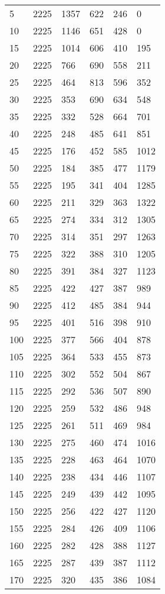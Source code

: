 \begin{longtable}{|l|l|l|l|l|l|}
5 & 2225 & 1357 & 622 & 246 & 0 \\
10 & 2225 & 1146 & 651 & 428 & 0 \\
15 & 2225 & 1014 & 606 & 410 & 195 \\
20 & 2225 & 766 & 690 & 558 & 211 \\
25 & 2225 & 464 & 813 & 596 & 352 \\
30 & 2225 & 353 & 690 & 634 & 548 \\
35 & 2225 & 332 & 528 & 664 & 701 \\
40 & 2225 & 248 & 485 & 641 & 851 \\
45 & 2225 & 176 & 452 & 585 & 1012 \\
50 & 2225 & 184 & 385 & 477 & 1179 \\
55 & 2225 & 195 & 341 & 404 & 1285 \\
60 & 2225 & 211 & 329 & 363 & 1322 \\
65 & 2225 & 274 & 334 & 312 & 1305 \\
70 & 2225 & 314 & 351 & 297 & 1263 \\
75 & 2225 & 322 & 388 & 310 & 1205 \\
80 & 2225 & 391 & 384 & 327 & 1123 \\
85 & 2225 & 422 & 427 & 387 & 989 \\
90 & 2225 & 412 & 485 & 384 & 944 \\
95 & 2225 & 401 & 516 & 398 & 910 \\
100 & 2225 & 377 & 566 & 404 & 878 \\
105 & 2225 & 364 & 533 & 455 & 873 \\
110 & 2225 & 302 & 552 & 504 & 867 \\
115 & 2225 & 292 & 536 & 507 & 890 \\
120 & 2225 & 259 & 532 & 486 & 948 \\
125 & 2225 & 261 & 511 & 469 & 984 \\
130 & 2225 & 275 & 460 & 474 & 1016 \\
135 & 2225 & 228 & 463 & 464 & 1070 \\
140 & 2225 & 238 & 434 & 446 & 1107 \\
145 & 2225 & 249 & 439 & 442 & 1095 \\
150 & 2225 & 256 & 422 & 427 & 1120 \\
155 & 2225 & 284 & 426 & 409 & 1106 \\
160 & 2225 & 282 & 428 & 388 & 1127 \\
165 & 2225 & 287 & 439 & 387 & 1112 \\
170 & 2225 & 320 & 435 & 386 & 1084 \\

\end{longtable}
